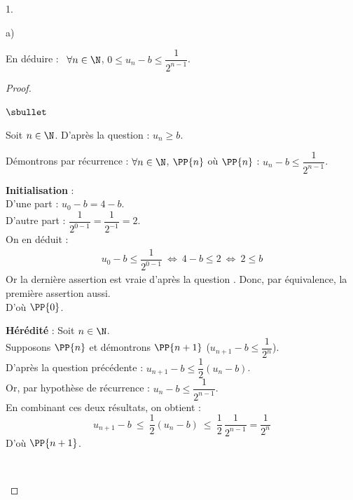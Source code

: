 \documentclass[11pt]{article}%
\begin{document}
\begin{noliste}{1.}
\begin{noliste}{a)}
    
  \item En déduire : \ $\forall n \in \N$, $0 \leq u_n-b \leq
    \dfrac{1}{2^{n-1}}$.
    
    \begin{proof}~
      \begin{noliste}{$\sbullet$}
	\item Soit $n\in \N$. D'après la question  : $u_n \geq 
	b$.
	
	\item Démontrons par récurrence : $\forall n\in \N$, $\PP{n}$
	\quad où \quad $\PP{n}$ : $u_n -b \leq \dfrac{1}{2^{n-1}}$.
	\begin{noliste}{\fitem}
	  \item {\bf Initialisation} :\\
	  D'une part : $u_0-b = 4-b$.\\
	  D'autre part : $\dfrac{1}{2^{0-1}} = \dfrac{1}{2^{-1}} = 2$.\\
	  On en déduit :
	  \[
	    \begin{array}{rcl}
	      u_0 -b \leq \dfrac{1}{2^{0-1}} \ \Leftrightarrow \
	      4-b \leq 2 \ \Leftrightarrow \ 2 \leq b
	    \end{array}
	  \]
	  Or la dernière assertion est vraie d'après la question 
	  . Donc, par équivalence, la première assertion 
	  aussi.\\
	  D'où $\PP{0}$.
	  
	  \item {\bf Hérédité} : Soit $n\in\N$.\\
	  Supposons $\PP{n}$ et démontrons $\PP{n+1}$ (\ie $u_{n+1} 
	  -b \leq \dfrac{1}{2^n}$).\\
	  D'après la question précédente : $u_{n+1} -b \leq 
	  \dfrac{1}{2}(u_n -b)$.\\[.1cm]
	  Or, par hypothèse de récurrence : $u_n -b \leq 
	  \dfrac{1}{2^{n-1}}$.\\[.1cm]
	  En combinant ces deux résultats, on obtient :
	  \[
	    u_{n+1} -b \ \leq \ \dfrac{1}{2} (u_n -b) \ \leq \ 
	    \dfrac{1}{2}
	    \, \dfrac{1}{2^{n-1}} = \dfrac{1}{2^n}
	  \]
	  D'où $\PP{n+1}$.
	\end{noliste}
	~\\[-1.2cm]
      \end{noliste}
    \end{proof}
  \end{noliste}
  

\end{noliste}
\end{document}
